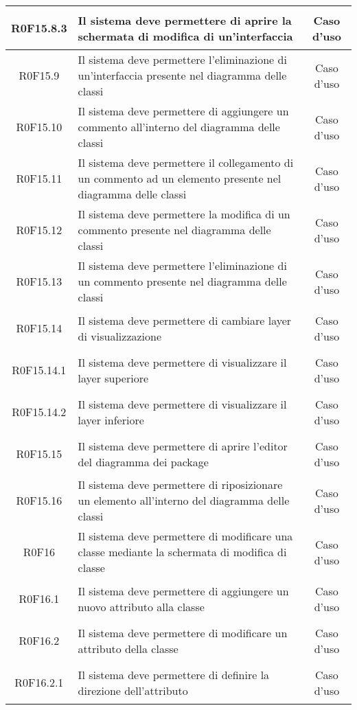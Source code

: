 \documentclass[../AnalisiDeiRequisiti.tex]{subfiles}
\begin{document}
\begin{longtable}{|c|>{\centering}p{7cm}|c|}
	\hypertarget{R0F15.8.3}{R0F15.8.3} & Il sistema deve permettere di aprire la schermata di modifica di un'interfaccia & Caso d'uso \\ \hline
	\hypertarget{R0F15.9}{R0F15.9} & Il sistema deve permettere l'eliminazione di un'interfaccia presente nel diagramma delle classi & Caso d'uso \\ \hline
	\hypertarget{R0F15.10}{R0F15.10} & Il sistema deve permettere di aggiungere un commento all'interno del diagramma delle classi & Caso d'uso \\ \hline
	\hypertarget{R0F15.11}{R0F15.11} & Il sistema deve permettere il collegamento di un commento ad un elemento presente nel diagramma delle classi & Caso d'uso \\ \hline
	\hypertarget{R0F15.12}{R0F15.12} & Il sistema deve permettere la modifica di un commento presente nel diagramma delle classi & Caso d'uso \\ \hline
	\hypertarget{R0F15.13}{R0F15.13} & Il sistema deve permettere l'eliminazione di un commento presente nel diagramma delle classi & Caso d'uso \\ \hline
	\hypertarget{R0F15.14}{R0F15.14} & Il sistema deve permettere di cambiare layer di visualizzazione & Caso d'uso \\ \hline
	\hypertarget{R0F15.14.1}{R0F15.14.1} & Il sistema deve permettere di visualizzare il layer superiore & Caso d'uso \\ \hline
	\hypertarget{R0F15.14.2}{R0F15.14.2} & Il sistema deve permettere di visualizzare il layer inferiore & Caso d'uso \\ \hline
	\hypertarget{R0F15.15}{R0F15.15} & Il sistema deve permettere di aprire l'editor del diagramma dei package & Caso d'uso \\ \hline
	\hypertarget{R0F15.16}{R0F15.16} & Il sistema deve permettere di riposizionare un elemento all'interno del diagramma delle classi & Caso d'uso \\ \hline
	\hypertarget{R0F16}{R0F16} & Il sistema deve permettere di modificare una classe mediante la schermata di modifica di classe & Caso d'uso \\ \hline
	\hypertarget{R0F16.1}{R0F16.1} & Il sistema deve permettere di aggiungere un nuovo attributo alla classe & Caso d'uso \\ \hline
	\hypertarget{R0F16.2}{R0F16.2} & Il sistema deve permettere di modificare un attributo della classe & Caso d'uso \\ \hline
	\hypertarget{R0F16.2.1}{R0F16.2.1} & Il sistema deve permettere di definire la direzione dell'attributo & Caso d'uso \\ \hline

\end{longtable}
\end{document}
